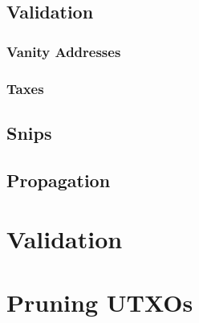 \documentclass[a4paper,11pt]{article}
\begin{document}
\subsection{Validation}

\subsubsection{Vanity Addresses}

\subsubsection{Taxes}

\subsection{Snips}

\subsection{Propagation}

\section{Validation}

\section{Pruning UTXOs}


\tableofcontents
\end{document}
